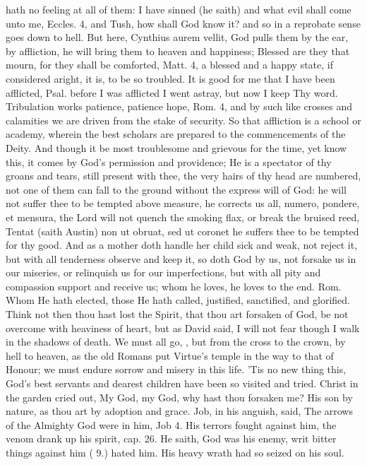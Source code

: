 {hath no feeling at all of them: I have sinned (he saith) and what evil
shall come unto me, Eccles.  4, and Tush, how shall God know it? and
so in a reprobate sense goes down to hell. But here, Cynthius aurem
vellit, God pulls them by the ear, by affliction, he will bring them to
heaven and happiness; Blessed are they that mourn, for they shall be
comforted, Matt.  4, a blessed and a happy state, if considered
aright, it is, to be so troubled. It is good for me that I have been
afflicted, Psal.  before I was afflicted I went astray, but now I
keep Thy word. Tribulation works patience, patience hope, Rom.  4,
and by such like crosses and calamities we are driven from the stake of
security. So that affliction is a school or academy, wherein the best
scholars are prepared to the commencements of the Deity. And though it
be most troublesome and grievous for the time, yet know this, it comes
by God's permission and providence; He is a spectator of thy groans and
tears, still present with thee, the very hairs of thy head are
numbered, not one of them can fall to the ground without the express
will of God: he will not suffer thee to be tempted above measure, he
corrects us all, numero, pondere, et mensura, the Lord will not
quench the smoking flax, or break the bruised reed, Tentat (saith
Austin) non ut obruat, sed ut coronet he suffers thee to be tempted for
thy good. And as a mother doth handle her child sick and weak, not
reject it, but with all tenderness observe and keep it, so doth God by
us, not forsake us in our miseries, or relinquish us for our
imperfections, but with all pity and compassion support and receive us;
whom he loves, he loves to the end. Rom.  Whom He hath elected,
those He hath called, justified, sanctified, and glorified. Think not
then thou hast lost the Spirit, that thou art forsaken of God, be not
overcome with heaviness of heart, but as David said, I will not fear
though I walk in the shadows of death. We must all go, , but from the cross to the crown, by hell to heaven,
as the old Romans put Virtue's temple in the way to that of Honour; we
must endure sorrow and misery in this life. 'Tis no new thing this,
God's best servants and dearest children have been so visited and
tried. Christ in the garden cried out, My God, my God, why hast thou
forsaken me? His son by nature, as thou art by adoption and grace. Job,
in his anguish, said, The arrows of the Almighty God were in him, Job
 4. His terrors fought against him, the venom drank up his spirit,
cap.  26. He saith, God was his enemy, writ bitter things against
him ( 9.) hated him. His heavy wrath had so seized on his soul.

}
